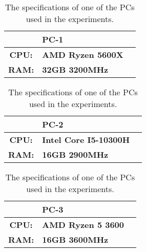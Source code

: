 
\begin{table}[htb!]
    \centering
    \begin{tabular}{cp{}p{}}
        \toprule
        \textbf{} & \textbf{PC-1} \\
        \midrule
        \textbf{CPU:} & \textbf{AMD Ryzen 5600X} \\
        \textbf{RAM:} & \textbf{32GB 3200MHz} \\
        \bottomrule
    \end{tabular}
    \caption{The specifications of one of the PCs used in the experiments.}
    \label{tab:pc1-specs}
\end{table}

\begin{table}[htb!]
    \centering
    \begin{tabular}{cp{}p{}}
        \toprule
        \textbf{} & \textbf{PC-2} \\
        \midrule
        \textbf{CPU:} & \textbf{Intel Core I5-10300H} \\
        \textbf{RAM:} & \textbf{16GB 2900MHz} \\
        \bottomrule
    \end{tabular}
    \caption{The specifications of one of the PCs used in the experiments.}
    \label{tab:pc2-specs}
\end{table}

\begin{table}[htb!]
    \centering
    \begin{tabular}{cp{}p{}}
        \toprule
        \textbf{} & \textbf{PC-3} \\
        \midrule
        \textbf{CPU:} & \textbf{AMD Ryzen 5 3600} \\
        \textbf{RAM:} & \textbf{16GB 3600MHz} \\
        \bottomrule
    \end{tabular}
    \caption{The specifications of one of the PCs used in the experiments.}
    \label{tab:pc3-specs}
\end{table}

